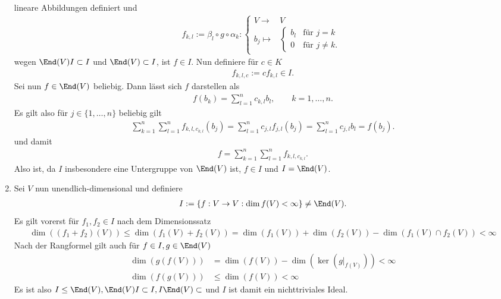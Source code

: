 \begin{solution}
\begin{enumerate}
  lineare Abbildungen definiert und
  \begin{align*}
    f_{k,l} := \beta_l \circ g \circ \alpha_k: \begin{cases}
      V \rightarrow & V \\
      b_j \mapsto & \begin{cases}
      b_l & \text{für } j = k\\
      0 & \text{für } j \neq k.
      \end{cases}
    \end{cases}
  \end{align*}
  wegen $\End(V)I \subset I$ und $\End(V) \subset I$, ist $f \in I$. Nun definiere
  für $c \in K$
  \begin{align*}
    f_{k,l,c} := c f_{k,l} \in I.
  \end{align*}
  Sei nun $f \in \End(V)$ beliebig. Dann lässt sich $f$ darstellen als
  \begin{align*}
    f(b_k) = \sum_{l=1}^n c_{k,l}b_l, \qquad k = 1,\dots,n.
  \end{align*}
  Es gilt also für $j \in \{1,\dots,n\}$ beliebig gilt
  \begin{align*}
    \sum_{k = 1}^n \sum_{l = 1}^n f_{k,l,c_{k,l}}(b_j) = \sum_{l=1}^n c_{j,l}f_{j,l}(b_j)
    = \sum_{l = 1}^n c_{j,l} b_l = f(b_j).
  \end{align*}
  und damit
  \begin{align*}
    f = \sum_{k=1}^n\sum_{l=1}^n f_{k,l,c_{k,l}}.
  \end{align*}
  Also ist, da $I$ insbesondere eine Untergruppe von $\End(V)$ ist, $f \in I$ und $I = \End(V)$.
  \item Sei $V$ nun unendlich-dimensional und definiere
  \begin{align*}
    I := \{f: V \rightarrow V: \dim f(V) < \infty \} \neq \End(V).
  \end{align*}
  Es gilt vorerst für $f_1,f_2 \in I$
  nach dem Dimensionssatz
  \begin{align*}
    \dim((f_1 + f_2)(V)) \leq \dim(f_1(V) + f_2(V)) =
    \dim(f_1(V)) + \dim(f_2(V)) - \dim(f_1(V) \cap f_2(V)) < \infty
  \end{align*}
  Nach der Rangformel gilt auch für $f \in I, g \in \End(V)$
  \begin{align*}
    \dim(g(f(V))) &= \dim(f(V)) - \dim(\ker (g|_{f(V)})) < \infty \\
    \dim(f(g(V))) &\leq \dim(f(V)) < \infty
  \end{align*}
  Es ist also $I \leq \End(V), \End(V)I \subset I, I\End(V) \subset$ und $I$
  ist damit ein nichttriviales Ideal.
\end{enumerate}
\end{solution}
